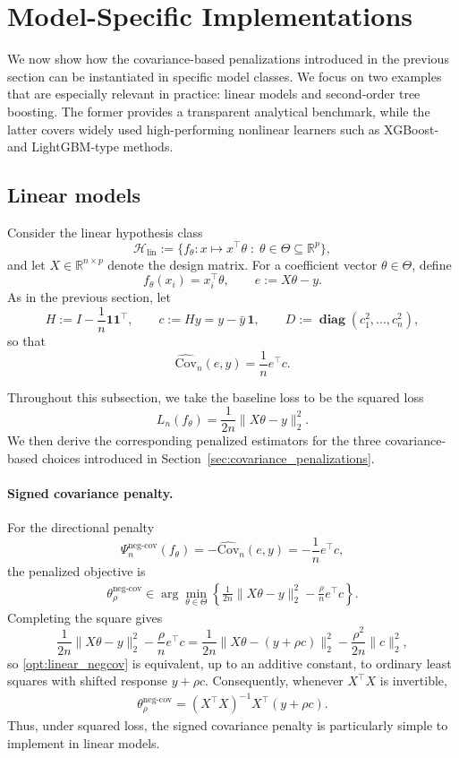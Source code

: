 \documentclass[12pt, draft]{article}
\theoremstyle{plain}
\theoremstyle{definition}
\newcommand{\R}{\mathbb{R}}
\newcommand{\1}{\mathbf{1}}
\newcommand{\Cov}{\text{Cov}}
\renewcommand{\H}{\mathcal{H}}
\renewcommand{\R}{\mathbb{R}}
\newcommand{\diag}{\mathbf{\operatorname{diag}}}
\begin{document}
\section{Model-Specific Implementations}
\label{sec:model_specific_implementations}

We now show how the covariance-based penalizations introduced in the previous section can be instantiated in specific model classes. We focus on two examples that are especially relevant in practice: linear models and second-order tree boosting. The former provides a transparent analytical benchmark, while the latter covers widely used high-performing nonlinear learners such as XGBoost- and LightGBM-type methods.

\subsection{Linear models}
\label{subsec:linear_models}

Consider the linear hypothesis class
\[
\H_{\mathrm{lin}} := \{f_\theta : x \mapsto x^\top \theta \;:\; \theta \in \Theta \subseteq \R^p\},
\]
and let $X \in \R^{n\times p}$ denote the design matrix. For a coefficient vector $\theta \in \Theta$, define
\[
f_\theta(x_i) = x_i^\top \theta,
\qquad
e := X\theta - y.
\]
As in the previous section, let
\[
H := I - \frac{1}{n}\mathbf{1}\mathbf{1}^\top,
\qquad
c := Hy = y - \bar y\,\mathbf{1},
\qquad
D := \diag(c_1^2,\dots,c_n^2),
\]
so that
\[
\widehat{\Cov}_n(e,y)
=
\frac{1}{n}e^\top c.
\]

Throughout this subsection, we take the baseline loss to be the squared loss
\[
L_n(f_\theta) = \frac{1}{2n}\|X\theta-y\|_2^2.
\]
We then derive the corresponding penalized estimators for the three covariance-based choices introduced in Section~\ref{sec:covariance_penalizations}.

\paragraph{Signed covariance penalty.}
For the directional penalty
\[
\Psi_n^{\mathrm{neg\mbox{-}cov}}(f_\theta)
=
-\widehat{\Cov}_n(e,y)
=
-\frac{1}{n}e^\top c,
\]
the penalized objective is
\begin{align}
    \label{opt:linear_negcov}
    \theta_{\rho}^{\mathrm{neg\mbox{-}cov}}
    \in
    \arg\min_{\theta\in\Theta}
    \left\{
        \frac{1}{2n}\|X\theta-y\|_2^2
        -
        \frac{\rho}{n}e^\top c
    \right\}.
\end{align}
Completing the square gives
\[
\frac{1}{2n}\|X\theta-y\|_2^2
-
\frac{\rho}{n}e^\top c
=
\frac{1}{2n}\|X\theta-(y+\rho c)\|_2^2
-
\frac{\rho^2}{2n}\|c\|_2^2,
\]
so \eqref{opt:linear_negcov} is equivalent, up to an additive constant, to ordinary least squares with shifted response $y+\rho c$. Consequently, whenever $X^\top X$ is invertible,
\begin{align}
    \label{eq:linear_negcov_closed_form}
    \theta_{\rho}^{\mathrm{neg\mbox{-}cov}}
    =
    (X^\top X)^{-1}X^\top (y+\rho c).
\end{align}
Thus, under squared loss, the signed covariance penalty is particularly simple to implement in linear models.
\end{document}
